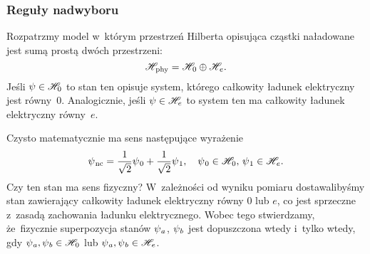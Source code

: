 \documentclass[10pt,t]{beamer}
\begin{document}
\begin{frame}
  \frametitle{Reguły nadwyboru}


  Rozpatrzmy model w~którym przestrzeń Hilberta opisująca cząstki
  naładowane jest sumą prostą dwóch przestrzeni:
  \begin{equation}
    \label{eq:Glowne-rodzaje-problemow-podczerwonych-01}
    \mathcal{H}_{ \hspace{0.07em} \text{phy} } =
    \mathcal{H}_{ \hspace{0.07em} 0 } \oplus \mathcal{H}_{ \hspace{0.07em} e }.
  \end{equation}
  Jeśli $\psi \in \mathcal{H}_{ 0 }$ to stan ten opisuje system, którego całkowity
  ładunek elektryczny jest równy~$0$. Analogicznie, jeśli
  $\psi \in \mathcal{H}_{ e }$ to system ten ma całkowity ładunek elektryczny
  równy~$e$.

  Czysto matematycznie ma sens następujące wyrażenie
  \begin{equation}
    \label{eq:Glowne-rodzaje-problemow-podczerwonych-02}
    \psi_{ \hspace{0.07em} \text{nc} } =
    \frac{ 1 }{ \sqrt{ 2 } } \psi_{ \hspace{0.07em} 0 } +
    \frac{ 1 }{ \sqrt{ 2 } } \psi_{ \hspace{0.07em} 1 }, \quad
    \psi_{ \hspace{0.07em} 0 } \in \mathcal{H}_{ \hspace{0.07em} 0 }, \,
    \psi_{ \hspace{0.07em} 1 } \in \mathcal{H}_{ \hspace{0.07em} e }.
  \end{equation}
  Czy ten stan ma sens fizyczny? W~zależności od wyniku pomiaru
  dostawalibyśmy stan zawierający całkowity ładunek elektryczny równy
  $0$ lub $e$, co jest sprzeczne z~zasadą zachowania ładunku elektrycznego.
  Wobec tego stwierdzamy, że~\alert{fizycznie} superpozycja stanów
  $\psi_{ \hspace{0.05em} a }$, $\psi_{ \hspace{0.05em} b }$ jest dopuszczona wtedy i~tylko
  wtedy, gdy $\psi_{ \hspace{0.05em} a }, \psi_{ \hspace{0.05em} b } \in \mathcal{H}_{ \hspace{0.07em} 0 }$
  lub $\psi_{ \hspace{0.05em} a }, \psi_{ \hspace{0.05em} b } \in \mathcal{H}_{ \hspace{0.07em} e }$.

\end{frame}
\end{document}
